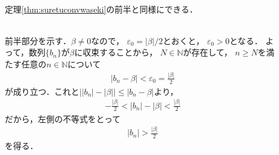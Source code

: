 \begin{description}
\item[] \mbox{} \\
  定理\ref{thm:suretuconvwaseki}の前半と同様にできる．
\item[] \mbox{} \\
  前半部分を示す．$\beta \neq 0$なので，
  $\varepsilon _0 = \lvert \beta \rvert /2$とおくと，
  $\varepsilon _0 >0$となる．
  よって，数列$\{ b_n \}$が$\beta$に収束することから，
  $N \in \mathbb{N}$が存在して，
  $n \geq N$を満たす任意の$n \in \mathbb{N}$について
  \begin{align*}
    \lvert b_n - \beta \rvert < \varepsilon_0 = \frac{ \lvert \beta \rvert }{2}
  \end{align*}
  が成り立つ．これと$\big \lvert \lvert b_n \rvert - \lvert \beta \rvert \big \rvert 
  \leq \lvert b_n - \beta \rvert $より，
  \begin{align*}
    - \frac{ \lvert \beta \rvert }{2} < \lvert b_n \rvert - \lvert \beta \rvert 
    < \frac{ \lvert \beta \rvert }{2} 
  \end{align*}
  だから，左側の不等式をとって
  \begin{align*}
    \lvert b_n \rvert > \frac{ \lvert \beta \rvert }{2}
  \end{align*}
  を得る．


\end{description}

